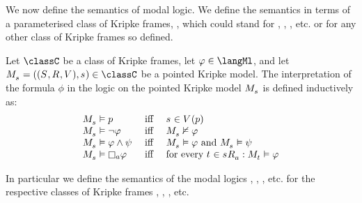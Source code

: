 We now define the semantics of modal logic.
We define the semantics in terms of a parameterised class of Kripke frames, \classC{}, which could stand for \classK{}, \classKF{}, \classKFF{}, etc. or for any other class of Kripke frames so defined.

\begin{definition}\label{ml-semantics}
Let $\classC$ be a class of Kripke frames, let $\phi \in \langMl$, and let $\kPModelAndTuple{\kStateS} \in \classC$ be a pointed Kripke model.
The interpretation of the formula $\phi$ in the logic \logicC{} on the pointed Kripke model $\kPModel{\kStateS}$ is defined inductively as:
$$
\begin{array}{lcl}
\kPModel{\kStateS} \entails \atomP & \text{ iff } & \kStateS \in \kValuation(\atomP)\\
\kPModel{\kStateS} \entails \lnot \phi & \text{ iff } & \kPModel{\kStateS} \nentails \phi\\
\kPModel{\kStateS} \entails \phi \land \psi & \text{ iff } & \kPModel{\kStateS} \entails \phi \text{ and } \kPModel{\kStateS} \entails \psi\\
\kPModel{\kStateS} \entails \necessaryA \phi & \text{ iff } & \text{for every } \kStateT \in \kSuccessorsA{\kStateS} : \kPModel{\kStateT} \entails \phi
\end{array}
$$
\end{definition}

In particular we define the semantics of the modal logics \logicK{}, \logicKF{}, \logicKFF{}, etc. for the respective classes of Kripke frames \classK{}, \classKF{}, \classKFF{}, etc.

